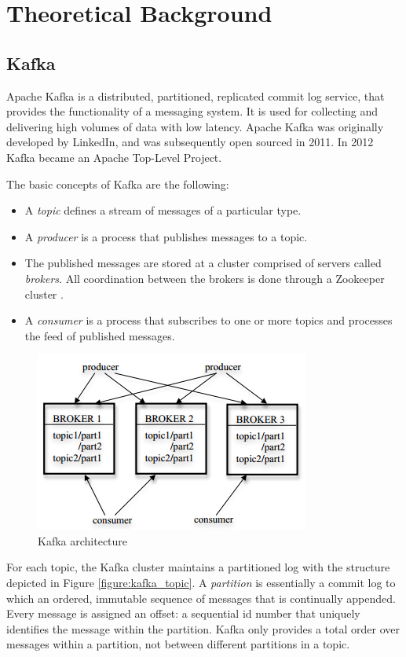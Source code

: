 \chapter{Theoretical Background}\label{chapter:theory}

\section{Kafka}\label{section:theory_kafka}

Apache Kafka \cite{kafka,kafka_documentation} is a distributed, partitioned, replicated commit log service, that provides the functionality of a messaging system. It is used for collecting and delivering high volumes of data with low latency. Apache Kafka was originally developed by LinkedIn, and was subsequently open sourced in 2011. In 2012 Kafka became an Apache Top-Level Project.

The basic concepts of Kafka are the following:
\begin{itemize}
\item A \emph{topic} defines a stream of messages of a particular type.
\item A \emph{producer} is a process that publishes messages to a topic.
\item The published messages are stored at a cluster comprised of servers called \emph{brokers}. All coordination between the brokers is done through a Zookeeper cluster \cite{zookeeper}.
\item A \emph{consumer} is a process that subscribes to one or more topics and processes the feed of published messages.
\end{itemize}

\begin{figure}[H]
\centering
\includegraphics{figures/kafka_arch}
\caption{Kafka architecture}
\label{figure:kafka_arch}
\end{figure}

For each topic, the Kafka cluster maintains a partitioned log with the structure depicted in Figure \ref{figure:kafka_topic}. A \emph{partition} is essentially a commit log to which an ordered, immutable sequence of messages that is continually appended. Every message is assigned an offset: a sequential id number that uniquely identifies the message within the partition. Kafka only provides a total order over messages within a partition, not between different partitions in a topic.

